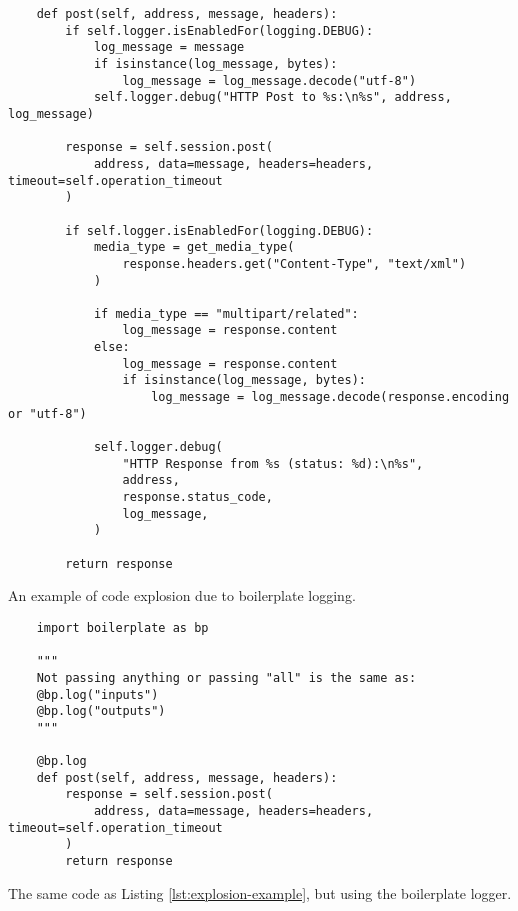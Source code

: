 \documentclass[acmsmall,review,authorversion]{acmart}
\begin{document}
    \begin{listing}[H]
    \begin{verbatim}
    def post(self, address, message, headers):
        if self.logger.isEnabledFor(logging.DEBUG):
            log_message = message
            if isinstance(log_message, bytes):
                log_message = log_message.decode("utf-8")
            self.logger.debug("HTTP Post to %s:\n%s", address, log_message)
    
        response = self.session.post(
            address, data=message, headers=headers, timeout=self.operation_timeout
        )
    
        if self.logger.isEnabledFor(logging.DEBUG):
            media_type = get_media_type(
                response.headers.get("Content-Type", "text/xml")
            )
    
            if media_type == "multipart/related":
                log_message = response.content
            else:
                log_message = response.content
                if isinstance(log_message, bytes):
                    log_message = log_message.decode(response.encoding or "utf-8")
    
            self.logger.debug(
                "HTTP Response from %s (status: %d):\n%s",
                address,
                response.status_code,
                log_message,
            )
    
        return response
    \end{verbatim}
    \caption{An example of code explosion due to boilerplate logging.}
    \label{lst:explosion-example}
    \end{listing}
    
    \begin{listing}[H]
    \begin{verbatim}
    import boilerplate as bp
    
    """
    Not passing anything or passing "all" is the same as:
    @bp.log("inputs")
    @bp.log("outputs")
    """
    
    @bp.log
    def post(self, address, message, headers):
        response = self.session.post(
            address, data=message, headers=headers, timeout=self.operation_timeout
        )
        return response
    \end{verbatim}
    \caption{The same code as Listing \ref{lst:explosion-example}, but using the boilerplate logger.}
    \label{lst:cleaned-example}
    \end{listing}
\end{document}
